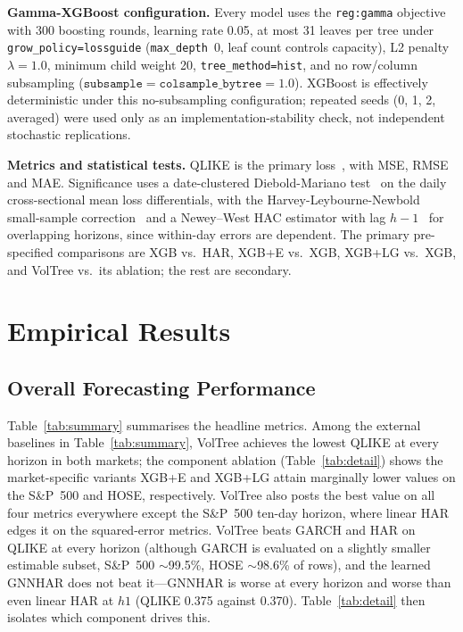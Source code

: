 \documentclass[runningheads,a4paper]{llncs}
\begin{document}
\textbf{Gamma-XGBoost configuration.} Every model uses the \texttt{reg:gamma} objective with 300 boosting
rounds, learning rate 0.05, at most 31 leaves per tree under \texttt{grow\_policy=lossguide}
(\texttt{max\_depth}~0, leaf count controls capacity), L2 penalty $\lambda=1.0$, minimum child weight 20,
\texttt{tree\_method=hist}, and no row/column subsampling
($\texttt{subsample}=\texttt{colsample\_bytree}=1.0$). XGBoost is effectively deterministic under this
no-subsampling configuration; repeated seeds (0, 1, 2, averaged) were used only as an implementation-stability
check, not independent stochastic replications.

\textbf{Metrics and statistical tests.} QLIKE is the primary loss~\cite{patton2011}, with MSE, RMSE and
MAE. Significance uses a date-clustered Diebold-Mariano test~\cite{dm1995} on the daily cross-sectional
mean loss differentials, with the Harvey-Leybourne-Newbold small-sample correction~\cite{hln1997} and a
Newey--West HAC estimator with lag $h-1$~\cite{neweywest1987} for overlapping horizons, since within-day
errors are dependent. The primary pre-specified comparisons are XGB vs.\ HAR, XGB+E vs.\ XGB, XGB+LG
vs.\ XGB, and VolTree vs.\ its ablation; the rest are secondary.


\section{Empirical Results}

\subsection{Overall Forecasting Performance}
Table~\ref{tab:summary} summarises the headline metrics. Among the external baselines in
Table~\ref{tab:summary}, VolTree achieves the lowest QLIKE at every horizon in both markets; the component
ablation (Table~\ref{tab:detail}) shows the market-specific variants XGB+E and XGB+LG attain marginally
lower values on the S\&P~500 and HOSE, respectively. VolTree also posts the best value on all four metrics
everywhere except the S\&P~500 ten-day horizon, where linear HAR edges it on the squared-error metrics.
VolTree beats GARCH and HAR on QLIKE at every horizon (although GARCH is evaluated on a slightly smaller
estimable subset, S\&P~500 $\sim$99.5\%, HOSE $\sim$98.6\% of rows), and the learned GNNHAR does not beat
it---GNNHAR is worse at every horizon and worse than even linear HAR at $h1$ (QLIKE 0.375 against 0.370).
Table~\ref{tab:detail} then isolates which component drives this.
\end{document}
